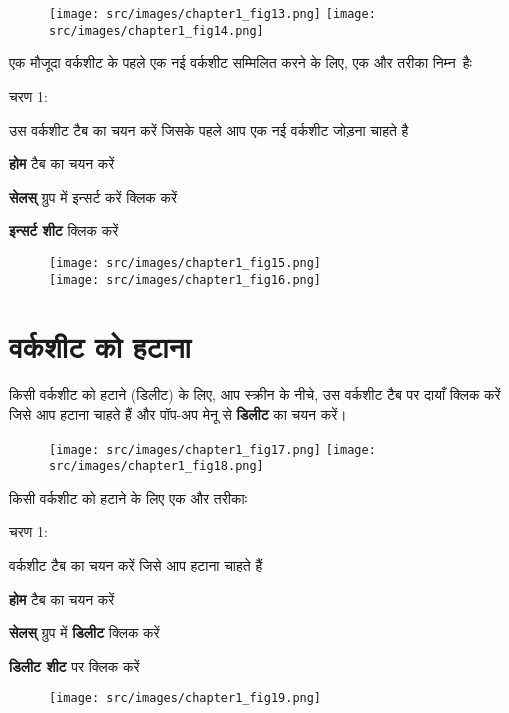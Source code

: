 \begin{figure}[H]
\centering
\texttt{[image: src/images/chapter1\_fig13.png]}
\texttt{[image: src/images/chapter1\_fig14.png]}
\end{figure}

एक मौजूदा वर्कशीट के पहले एक नई वर्कशीट सम्मिलित करने के लिए, एक और तरीका निम्न~हैः
\begin{descriptionSimple}{चरण 1:}
\item[चरण 1] उस वर्कशीट टैब का चयन करें जिसके पहले आप एक नई वर्कशीट जोड़ना चाहते है
\item[चरण 2] \textbf{होम} टैब का चयन करें
\item[चरण 3] \textbf{सेलस्} ग्रुप में इन्सर्ट करें क्लिक करें
\item[चरण 4] \textbf{इन्सर्ट शीट} क्लिक करें
\end{descriptionSimple}

\begin{figure}[H]
\centering
\texttt{[image: src/images/chapter1\_fig15.png]}\\[5pt]
\texttt{[image: src/images/chapter1\_fig16.png]}
\end{figure}

\section{वर्कशीट को हटाना}\label{id-1.10}			

किसी वर्कशीट को हटाने (डिलीट) के लिए, आप स्क्रीन के नीचे, उस वर्कशीट टैब पर दायाँ क्लिक करें जिसे आप हटाना चाहते हैं और पॉप-अप मेनू से \textbf{डिलीट} का चयन करें।

\begin{figure}[H]
\centering
\texttt{[image: src/images/chapter1\_fig17.png]}
\texttt{[image: src/images/chapter1\_fig18.png]}
\end{figure}

किसी वर्कशीट को हटाने के लिए एक और तरीकाः
\begin{descriptionSimple}{चरण 1:}
\item[चरण 1] वर्कशीट टैब का चयन करें जिसे आप हटाना चाहते हैं
\item[चरण 2] \textbf{होम} टैब का चयन करें
\item[चरण 3] \textbf{सेलस्} ग्रुप में \textbf{डिलीट} क्लिक करें
\item[चरण 4] \textbf{डिलीट शीट} पर क्लिक करें
\end{descriptionSimple}				
\begin{figure}[H]
\centering
\texttt{[image: src/images/chapter1\_fig19.png]}
\end{figure}

